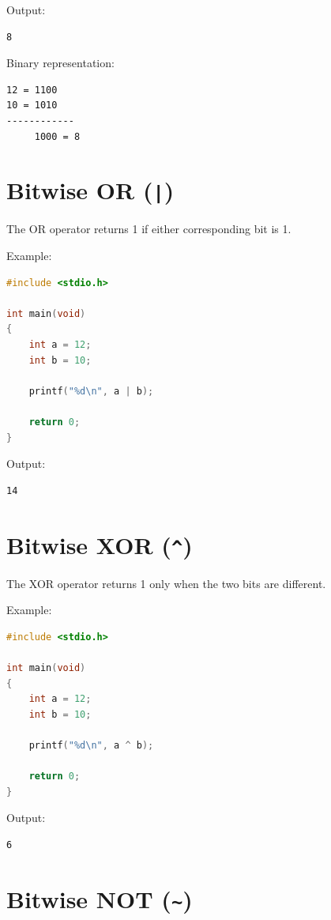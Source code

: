 \documentclass[12pt,openany]{book}
\begin{document}
Output:

\begin{lstlisting}
8
\end{lstlisting}

Binary representation:

\begin{lstlisting}
12 = 1100
10 = 1010
------------
     1000 = 8
\end{lstlisting}
\section{Bitwise OR (\texttt{|})}

The OR operator returns 1 if either corresponding bit is 1.

Example:

\begin{lstlisting}[language=C]
#include <stdio.h>

int main(void)
{
    int a = 12;
    int b = 10;

    printf("%d\n", a | b);

    return 0;
}
\end{lstlisting}

Output:

\begin{lstlisting}
14
\end{lstlisting}

\section{Bitwise XOR (\texttt{\^{}})}

The XOR operator returns 1 only when the two bits are different.

Example:

\begin{lstlisting}[language=C]
#include <stdio.h>

int main(void)
{
    int a = 12;
    int b = 10;

    printf("%d\n", a ^ b);

    return 0;
}
\end{lstlisting}

Output:

\begin{lstlisting}
6
\end{lstlisting}

\section{Bitwise NOT (\texttt{\textasciitilde})}
\end{document}
